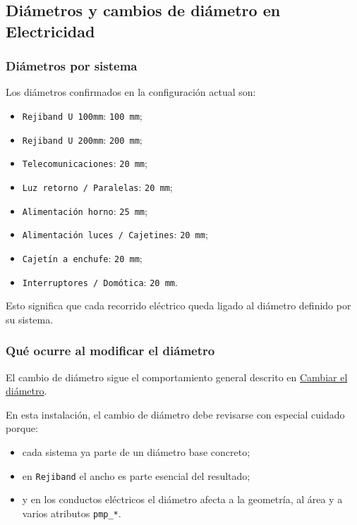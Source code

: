 \subsection{Diámetros y cambios de diámetro en Electricidad}

\subsubsection{Diámetros por sistema}

Los diámetros confirmados en la configuración actual son:

\begin{itemize}
\item \texttt{Rejiband U 100mm}: \texttt{100 mm};
\item \texttt{Rejiband U 200mm}: \texttt{200 mm};
\item \texttt{Telecomunicaciones}: \texttt{20 mm};
\item \texttt{Luz retorno / Paralelas}: \texttt{20 mm};
\item \texttt{Alimentación horno}: \texttt{25 mm};
\item \texttt{Alimentación luces / Cajetines}: \texttt{20 mm};
\item \texttt{Cajetín a enchufe}: \texttt{20 mm};
\item \texttt{Interruptores / Domótica}: \texttt{20 mm}.
\end{itemize}

Esto significa que cada recorrido eléctrico queda ligado al diámetro definido por su sistema.


\subsubsection{Qué ocurre al modificar el diámetro}

El cambio de diámetro sigue el comportamiento general descrito en \hyperref[sec:cambiar-diametro]{Cambiar el diámetro}.

En esta instalación, el cambio de diámetro debe revisarse con especial cuidado porque:

\begin{itemize}
\item cada sistema ya parte de un diámetro base concreto;
\item en \texttt{Rejiband} el ancho es parte esencial del resultado;
\item y en los conductos eléctricos el diámetro afecta a la geometría, al área y a varios atributos \texttt{pmp\_*}.
\end{itemize}

